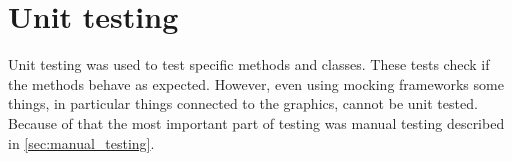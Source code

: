 \section{Unit testing} \label{sec:unit_testing}
Unit testing was used to test specific methods and classes.
These tests check if the methods behave as expected.
However, even using mocking frameworks some things, in particular things connected to the graphics, cannot be unit tested.
Because of that the most important part of testing was manual testing described in \autoref{sec:manual_testing}.
